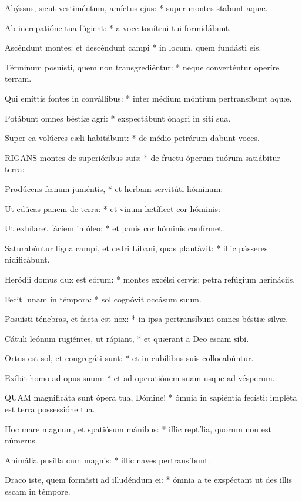 Abýssus, sicut vestiméntum, amíctus ejus: * super montes stabunt aquæ.

Ab increpatióne tua fúgient: * a voce tonítrui tui formidábunt.

Ascéndunt montes: et descéndunt campi * in locum, quem fundásti eis.

Términum posuísti, quem non transgrediéntur: * neque converténtur operíre terram.

Qui emíttis fontes in convállibus: * inter médium móntium pertransíbunt aquæ.

Potábunt omnes béstiæ agri: * exspectábunt ónagri in siti sua.

Super ea volúcres cæli habitábunt: * de médio petrárum dabunt voces.


\lettrine[lines=2]{R}{IGANS} montes de superióribus suis: * de fructu óperum tuórum satiábitur terra:

Prodúcens fœnum juméntis, * et herbam servitúti hóminum:

Ut edúcas panem de terra: * et vinum lætíficet cor hóminis:

Ut exhílaret fáciem in óleo: * et panis cor hóminis confírmet.

Saturabúntur ligna campi, et cedri Líbani, quas plantávit: * illic pásseres nidificábunt.

Heródii domus dux est eórum: * montes excélsi cervis: petra refúgium herináciis.

Fecit lunam in témpora: * sol cognóvit occásum suum.

Posuísti ténebras, et facta est nox: * in ipsa pertransíbunt omnes béstiæ silvæ.

Cátuli leónum rugiéntes, ut rápiant, * et quærant a Deo escam sibi.

Ortus est sol, et congregáti sunt: * et in cubílibus suis collocabúntur.

Exíbit homo ad opus suum: * et ad operatiónem suam usque ad vésperum.


\lettrine[lines=2]{Q}{UAM} magnificáta sunt ópera tua, Dómine! * ómnia in sapiéntia fecísti: impléta est terra possessióne tua.

Hoc mare magnum, et spatiósum mánibus: * illic reptília, quorum non est númerus.

Animália pusílla cum magnis: * illic naves pertransíbunt.

Draco iste, quem formásti ad illudéndum ei: * ómnia a te exspéctant ut des illis escam in témpore.

